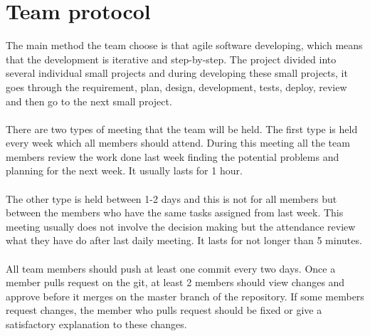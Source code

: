\section{Team protocol}
The main method the team choose is that agile software developing, which means that the development is iterative and step-by-step. The project divided into several individual small projects and during developing these small projects, it goes through the requirement, plan, design, development, tests, deploy, review and then go to the next small project.\\\\
There are two types of meeting that the team will be held. The first type is held every week which all members should attend. During this meeting all the team members review the work done last week finding the potential problems and planning for the next week. It usually lasts for 1 hour.\\\\
The other type is held between 1-2 days and this is not for all members but between the members who have the same tasks assigned from last week. This meeting usually does not involve the decision making but the attendance review what they have do after last daily meeting. It lasts for not longer than 5 minutes.\\\\
All team members should push at least one commit every two days. Once a member pulls request on the git, at least 2 members should view changes and approve before it merges on the master branch of the repository. If some members request changes, the member who pulls request should be fixed or give a satisfactory explanation to these changes.
